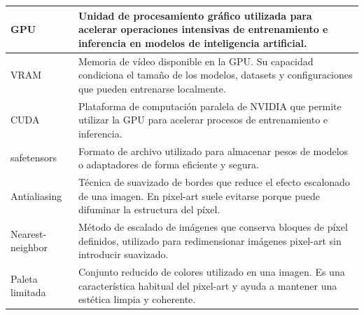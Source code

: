 \documentclass[a4paper,11pt,titlepage]{scrbook}
\begin{document}
\begin{longtable}{|L{0.25\textwidth}|L{0.65\textwidth}|}
GPU & Unidad de procesamiento gráfico utilizada para acelerar operaciones intensivas de entrenamiento e inferencia en modelos de inteligencia artificial. \\
\hline

VRAM & Memoria de vídeo disponible en la GPU. Su capacidad condiciona el tamaño de los modelos, datasets y configuraciones que pueden entrenarse localmente. \\
\hline

CUDA & Plataforma de computación paralela de NVIDIA que permite utilizar la GPU para acelerar procesos de entrenamiento e inferencia. \\
\hline

safetensors & Formato de archivo utilizado para almacenar pesos de modelos o adaptadores de forma eficiente y segura. \\
\hline

Antialiasing & Técnica de suavizado de bordes que reduce el efecto escalonado de una imagen. En pixel-art suele evitarse porque puede difuminar la estructura del píxel. \\
\hline

Nearest-neighbor & Método de escalado de imágenes que conserva bloques de píxel definidos, utilizado para redimensionar imágenes pixel-art sin introducir suavizado. \\
\hline

Paleta limitada & Conjunto reducido de colores utilizado en una imagen. Es una característica habitual del pixel-art y ayuda a mantener una estética limpia y coherente. \\
\hline

\end{longtable}
\end{document}
